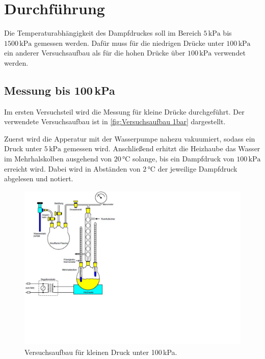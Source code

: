 \section{Durchführung}
\label{sec:Durchführung}

Die Temperaturabhängigkeit des Dampfdruckes soll im Bereich $5\,\unit{\kilo\pascal}$ bis $1500\,\unit{\kilo\pascal}$
gemessen werden.
Dafür muss für die niedrigen Drücke unter $100\,\unit{\kilo\pascal}$ ein anderer Versuchsaufbau als für die hohen
Drücke über $100\,\unit{\kilo\pascal}$ verwendet werden.

\subsection{Messung bis 100\,kPa}
\label{sec:Messung bis 1 bar}

Im ersten Versuchsteil wird die Messung für kleine Drücke durchgeführt.
Der verwendete Versuchsaufbau ist in \autoref{fig:Versuchsaufbau 1bar} dargestellt.

Zuerst wird die Apperatur mit der Wasserpumpe nahezu vakuumiert, sodass ein Druck unter $5\,\unit{\kilo\pascal}$ gemessen wird.
Anschließend erhitzt die Heizhaube das Wasser im Mehrhalskolben ausgehend von $20\,\unit{\celsius}$ solange, bis ein Dampfdruck
von $100\,\unit{\kilo\pascal}$ erreicht wird.
Dabei wird in Abständen von $2\,\unit{\celsius}$ der jeweilige Dampfdruck abgelesen und notiert.

\begin{figure} [H]
    \centering
    \includegraphics[height=8cm]{content/Bilder/Versuchsaufbau_1bar.pdf}
    \caption{Versuchsaufbau für kleinen Druck unter 100\,kPa. \cite{v203}}
    \label{fig:Versuchsaufbau 1bar}
\end{figure}

